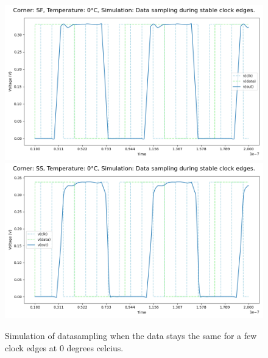 \begin{figure}[H]
    \vspace{5pt}
    \includegraphics[height= 0.21\textheight]{figures/aimspice/SF/0/W2.csv.png}
    \vspace{5pt}
    \includegraphics[height= 0.21\textheight]{figures/aimspice/SS/0/W2.csv.png}
    \caption{Simulation of datasampling when the data stays the same for a few clock edges at 0 degrees celcius.}
    \label{fig:aimspice_W2_0}
\end{figure}

\pagebreak


